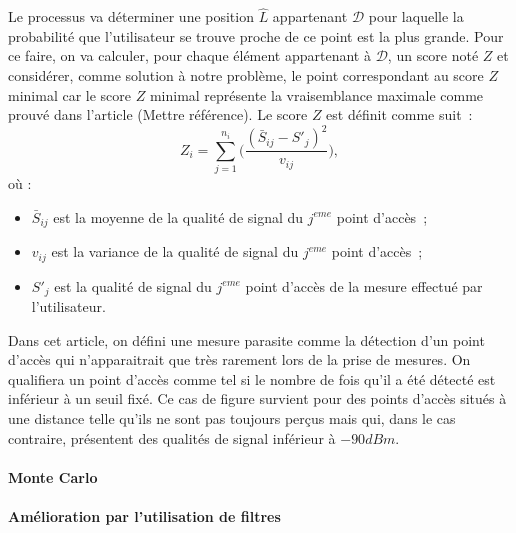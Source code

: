 \documentclass[10pt,journal,compsoc]{IEEEtran}
\begin{document}
        Le processus va déterminer une position $\hat{L}$ appartenant $\mathcal{D}$ pour laquelle la probabilité que l'utilisateur se trouve proche de ce point est la plus grande.
		Pour ce faire, on va calculer, pour chaque élément appartenant à $\mathcal{D}$, un score noté $Z$ et considérer, comme solution à notre problème, le point correspondant
		au score $Z$ minimal car le score $Z$ minimal représente la vraisemblance maximale comme prouvé dans l'article (Mettre référence). %
		Le score $Z$ est définit comme suit~:
        \begin{equation}
          Z_{i} = \sum\limits_{j = 1}^{n_{i}}\bigg(\frac{(\bar{S}_{ij}-S'_{j})^{2}}{v_{ij}}\bigg),
        \end{equation}
        où :
        \begin{itemize}
          \item $\bar{S}_{ij}$ est la moyenne de la qualité de signal du $j^{eme}$ point d'accès~;
          \item $v_{ij}$ est la variance de la qualité de signal du $j^{eme}$ point d'accès~;
          \item $S'_{j}$ est la qualité de signal du $j^{eme}$ point d'accès de la mesure effectué par l'utilisateur.
        \end{itemize}

        \begin{tcolorbox}[title = Mesures parasites]
          Dans cet article, on défini une mesure parasite comme la détection d'un point d'accès qui n'apparaitrait que très rarement lors de la prise de mesures. On qualifiera
		  un point d'accès comme tel si le nombre de fois qu'il a été détecté est inférieur à un seuil fixé.
          Ce cas de figure survient pour des points d'accès situés à une distance telle qu'ils ne sont pas toujours perçus mais qui, dans le cas contraire, présentent des qualités
		  de signal inférieur à $-90 dBm$.
        \end{tcolorbox}

      \paragraph{Monte Carlo}
      \paragraph{Amélioration par l'utilisation de filtres}
\end{document}

